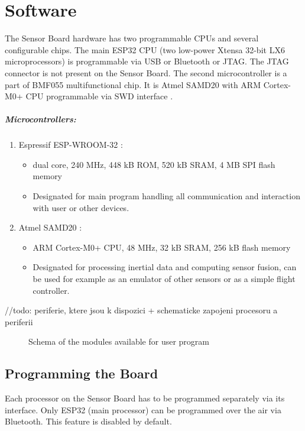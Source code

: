 \chapter{Software}
The Sensor Board hardware has two programmable CPUs and several configurable chips. The main ESP32 CPU (two low-power Xtensa 32-bit LX6 microprocessors) \cite{espressif:ESP-WROOM-32} is programmable via USB or Bluetooth or JTAG. The JTAG connector is not present on the Sensor Board. The second microcontroller is a part of BMF055 \cite{bosch:BMF055} multifunctional chip. It is Atmel SAMD20 \cite{atmel:SAMD20} with ARM Cortex-M0+ CPU programmable via SWD interface \cite{SWDinterface}.

\paragraph{Microcontrollers:}
\begin{enumerate}
	\item Espressif ESP-WROOM-32 \cite{espressif:ESP-WROOM-32}:
		\begin{itemize}
			\item dual core, 240 MHz, 448 kB ROM, 520 kB SRAM, 4 MB SPI flash memory
			\item Designated for main program handling all communication and interaction with user or other devices.
		\end{itemize}
	\item Atmel SAMD20 \cite{atmel:SAMD20}:
		\begin{itemize}
			\item ARM Cortex-M0+ CPU, 48 MHz, 32 kB SRAM, 256 kB flash memory
			\item Designated for processing inertial data and computing sensor fusion, can be used for example as an emulator of other sensors or as a simple flight controller.
		\end{itemize}
\end{enumerate}

//todo: periferie, ktere jsou k dispozici + schematicke zapojeni procesoru a periferii
\begin{figure}
	\centering
	\label{fig:SWmodules}
	\caption{Schema of the modules available for user program}
\end{figure}

\section{Programming the Board}
Each processor on the Sensor Board has to be programmed separately via its interface. Only ESP32 \cite{espressif:ESP-WROOM-32} (main processor) can be programmed over the air via Bluetooth. This feature is disabled by default.

